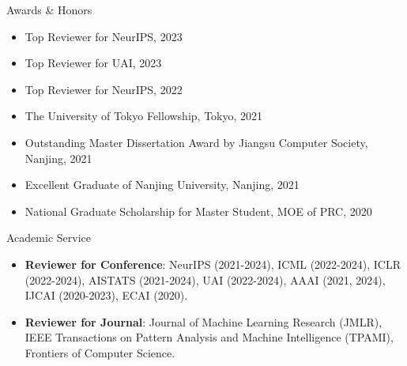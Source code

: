 \documentclass{resume} %
\begin{document}






\begin{rSection}{Awards \& Honors}
\begin{itemize}[leftmargin=*]
\item Top Reviewer for NeurIPS, 2023
\item Top Reviewer for UAI, 2023
\item Top Reviewer for NeurIPS, 2022
\item The University of Tokyo Fellowship, Tokyo, 2021
\item Outstanding Master Dissertation Award by Jiangsu Computer Society, Nanjing, 2021
\item Excellent Graduate of Nanjing University, Nanjing, 2021
\item National Graduate Scholarship for Master Student, MOE of PRC, 2020
\end{itemize}
\end{rSection}

\begin{rSection}{Academic Service}
\begin{itemize}[leftmargin=*]
\item \textbf{Reviewer for Conference}: NeurIPS (2021-2024), ICML (2022-2024), ICLR (2022-2024), AISTATS (2021-2024), UAI (2022-2024), AAAI (2021, 2024), IJCAI (2020-2023), ECAI (2020).
\item \textbf{Reviewer for Journal}: Journal of Machine Learning Research (JMLR), IEEE Transactions on Pattern Analysis and Machine Intelligence (TPAMI), Frontiers of Computer Science.
\end{itemize}

\end{rSection}
\end{document}
